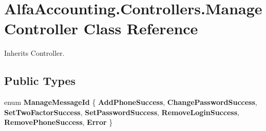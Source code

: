 \hypertarget{class_alfa_accounting_1_1_controllers_1_1_manage_controller}{}\section{Alfa\+Accounting.\+Controllers.\+Manage\+Controller Class Reference}
\label{class_alfa_accounting_1_1_controllers_1_1_manage_controller}


Inherits Controller.

\subsection*{Public Types}
\begin{DoxyCompactItemize}
\item 
\mbox{\label{class_alfa_accounting_1_1_controllers_1_1_manage_controller_ab3c09b6b38616c7973e321c508c88336}} 
enum {\bfseries Manage\+Message\+Id} \{ \newline
{\bfseries Add\+Phone\+Success}, 
{\bfseries Change\+Password\+Success}, 
{\bfseries Set\+Two\+Factor\+Success}, 
{\bfseries Set\+Password\+Success}, 
\newline
{\bfseries Remove\+Login\+Success}, 
{\bfseries Remove\+Phone\+Success}, 
{\bfseries Error}
 \}
\end{DoxyCompactItemize}
